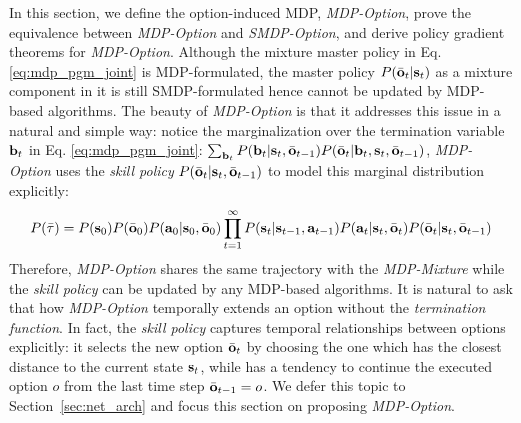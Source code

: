 \documentclass{article}
\begin{document}
In this section, we define the option-induced MDP,
\emph{MDP-Option}, prove the equivalence between \emph{MDP-Option}
and \emph{SMDP-Option}, and derive policy gradient theorems for
\emph{MDP-Option}. Although the mixture master policy in
Eq.\ref{eq:mdp_pgm_joint} is MDP-formulated, the master policy
$P(\bar{{\mathbf{o}}}_t|{\mathbf{s}}_t)$ as a mixture component in it is still
SMDP-formulated hence cannot be updated by MDP-based algorithms.
The beauty of \emph{MDP-Option} is that it addresses this issue in a
natural and simple way: notice the marginalization over the
termination variable ${\mathbf{b}}_t$ in Eq. \ref{eq:mdp_pgm_joint}:
$\sum_{{\mathbf{b}}_t}P({\mathbf{b}}_t|{\mathbf{s}}_t,\bar{{\mathbf{o}}}_{t-1})P(\bar{{\mathbf{o}}}_t|{\mathbf{b}}_t,{\mathbf{s}}_t,\bar{{\mathbf{o}}}_{t-1})$,
\emph{MDP-Option} uses the \emph{skill policy}
$P(\bar{{\mathbf{o}}}_t|{\mathbf{s}}_t,\bar{{\mathbf{o}}}_{t-1})$ to model this marginal
distribution explicitly:
\begin{align}
  \label{eq:sa_pgm_joint}
  P(\bar{\tau})=P({\mathbf{s}}_0)P(\bar{{\mathbf{o}}}_0)P({\mathbf{a}}_0|{\mathbf{s}}_0,\bar{{\mathbf{o}}}_0)
  \prod_{t=1}^\infty P({\mathbf{s}}_t|{\mathbf{s}}_{t-1},{\mathbf{a}}_{t-1})
  P({\mathbf{a}}_{t}|{\mathbf{s}}_{t},\bar{{\mathbf{o}}}_{t})P(\bar{{\mathbf{o}}}_t|{\mathbf{s}}_t,\bar{{\mathbf{o}}}_{t-1})
\end{align}
Therefore, \emph{MDP-Option} shares the same trajectory with the \emph{MDP-Mixture}
while the \emph{skill policy} can be updated by any MDP-based
algorithms. It is natural to ask that how \emph{MDP-Option} temporally
extends an option without the \emph{termination function}. In
fact, the \emph{skill policy} captures temporal relationships
between options explicitly: it selects the new option
$\bar{{\mathbf{o}}}_t$ by choosing the one which has the closest distance
to the current state ${\mathbf{s}}_t$, while has a tendency to continue
the executed option $o$ from the last time step
$\bar{{\mathbf{o}}}_{t-1}=o$. We defer this topic to
Section~\ref{sec:net_arch} and focus this section on proposing
\emph{MDP-Option}.
\end{document}

